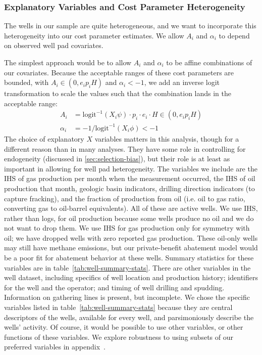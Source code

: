 \subsubsection{Explanatory Variables and Cost Parameter Heterogeneity}
The wells in our sample are quite heterogeneous, and we want to incorporate this heterogeneity into our cost parameter estimates.
We allow \(A_i\) and \(\alpha_i\) to depend on observed well pad covariates.

The simplest approach would be to allow \(A_i\) and \(\alpha_i\) to be affine combinations of our covariates.
Because the acceptable ranges of these cost parameters are bounded, with \(A_i \in (0, e_i p_i H)\) and \(\alpha_i < -1\), we add an inverse logit transformation to scale the values such that the combination lands in the acceptable range:
\begin{align}
\label{eqn:cost-param-bounds}
    A_i &= \text{logit}^{-1}(X_i\psi) \cdot p_i \cdot e_i \cdot H \in (0, e_i p_i H)\\
    \alpha_i &= -1 / \text{logit}^{-1}(X_i\phi) < -1 \nonumber
\end{align}
The choice of explanatory \(X\) variables matters in this analysis, though for a different reason than in many analyses.
They have some role in controlling for endogeneity (discussed in \ref{sec:selection-bias}),
but their role is at least as important in allowing for well pad heterogeneity.
The variables we include are the \gls{IHS} of gas production per month when the measurement occurred, the \gls{IHS} of oil production that month, geologic basin indicators, drilling direction indicators (to capture fracking), and the fraction of production from oil (i.e. oil to gas ratio, converting gas to oil-barrel equivalents).
All of these are active wells.
We use \gls{IHS}, rather than logs, for oil production because some wells produce no oil and we do not want to drop them.
We use \gls{IHS} for gas production only for symmetry with oil;
we have dropped wells with zero reported gas production.
These oil-only wells may still have methane emissions, but our private-benefit abatement model would be a poor fit for abatement behavior at these wells.
Summary statistics for these variables are in table~\ref{tab:well-summary-stats}.
There are other variables in the well dataset, including specifics of well location and production history; identifiers for the well and the operator; and timing of well drilling and spudding.
Information on gathering lines is present, but incomplete.
We chose the specific variables listed in table~\ref{tab:well-summary-stats} because they are central descriptors of the wells, available for every well, and parsimoniously describe the wells' activity.
Of course, it would be possible to use other variables, or other functions of these variables.
We explore robustness to using subsets of our preferred variables in appendix~\iftoggle{usexr}{\ref{app:robustness-to-alternative-sets-of-variables}}{A6}.

